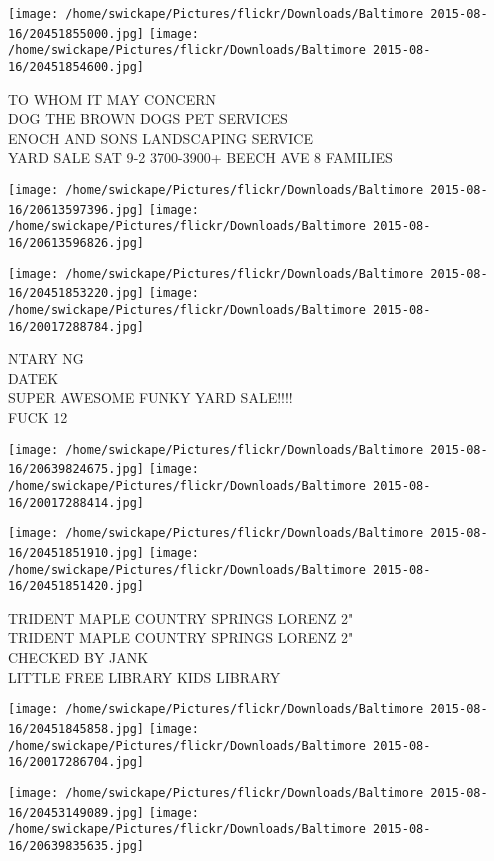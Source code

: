 \documentclass[10pt,letterpaper]{article}
\begin{document}
\texttt{[image: /home/swickape/Pictures/flickr/Downloads/Baltimore 2015-08-16/20451855000.jpg]}
\texttt{[image: /home/swickape/Pictures/flickr/Downloads/Baltimore 2015-08-16/20451854600.jpg]}

TO WHOM IT MAY CONCERN\\
DOG THE BROWN DOGS PET SERVICES\\
ENOCH AND SONS LANDSCAPING SERVICE\\
YARD SALE SAT 9{-}2 3700{-}3900+ BEECH AVE 8 FAMILIES
\pagebreak

\texttt{[image: /home/swickape/Pictures/flickr/Downloads/Baltimore 2015-08-16/20613597396.jpg]}
\texttt{[image: /home/swickape/Pictures/flickr/Downloads/Baltimore 2015-08-16/20613596826.jpg]}

\texttt{[image: /home/swickape/Pictures/flickr/Downloads/Baltimore 2015-08-16/20451853220.jpg]}
\texttt{[image: /home/swickape/Pictures/flickr/Downloads/Baltimore 2015-08-16/20017288784.jpg]}

NTARY NG\\
DATEK\\
SUPER AWESOME FUNKY YARD SALE!!!!\\
FUCK 12
\pagebreak

\texttt{[image: /home/swickape/Pictures/flickr/Downloads/Baltimore 2015-08-16/20639824675.jpg]}
\texttt{[image: /home/swickape/Pictures/flickr/Downloads/Baltimore 2015-08-16/20017288414.jpg]}

\texttt{[image: /home/swickape/Pictures/flickr/Downloads/Baltimore 2015-08-16/20451851910.jpg]}
\texttt{[image: /home/swickape/Pictures/flickr/Downloads/Baltimore 2015-08-16/20451851420.jpg]}

TRIDENT MAPLE COUNTRY SPRINGS LORENZ 2"\\
TRIDENT MAPLE COUNTRY SPRINGS LORENZ 2"\\
CHECKED BY JANK\\
LITTLE FREE LIBRARY KIDS LIBRARY
\pagebreak

\texttt{[image: /home/swickape/Pictures/flickr/Downloads/Baltimore 2015-08-16/20451845858.jpg]}
\texttt{[image: /home/swickape/Pictures/flickr/Downloads/Baltimore 2015-08-16/20017286704.jpg]}

\texttt{[image: /home/swickape/Pictures/flickr/Downloads/Baltimore 2015-08-16/20453149089.jpg]}
\texttt{[image: /home/swickape/Pictures/flickr/Downloads/Baltimore 2015-08-16/20639835635.jpg]}
\end{document}
